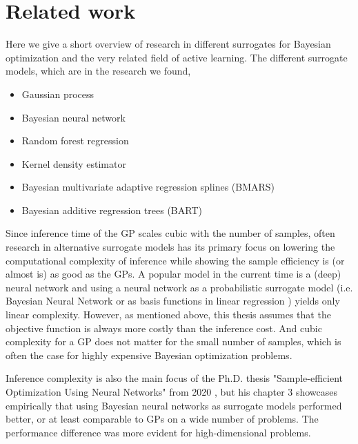     

\section{Related work}
Here we give a short overview of research in different surrogates for Bayesian optimization
and the very related field of active learning. The different surrogate models, which are in the 
research we found, 
\begin{itemize}[noitemsep]
    \item Gaussian process
    \item Bayesian neural network
    \item Random forest regression
    \item Kernel density estimator
    \item Bayesian multivariate adaptive regression splines (BMARS)
    \item Bayesian additive regression trees (BART)
\end{itemize}

Since inference time of the GP scales cubic with the number of samples, often research in
alternative surrogate models has its primary focus on lowering the computational complexity of
inference while showing the sample efficiency is (or almost is) as good as the GPs. A popular model
in the current time is a (deep) neural network and using a neural network as a probabilistic
surrogate model (i.e. Bayesian Neural Network \cite{BOHAMIANN} or as basis functions in linear
regression \cite{DNGO}) yields only linear complexity. However, as mentioned above, this thesis
assumes that the objective function is always more costly than the inference cost. And cubic
complexity for a GP does not matter for the small number of samples, which is often the case for
highly expensive Bayesian optimization problems. 

Inference complexity is also the main focus of the Ph.D. thesis "Sample-efficient Optimization Using
Neural Networks" from 2020 \cite{PhDthesis}, but his chapter 3 showcases empirically that using Bayesian
neural networks as surrogate models performed better, or at least comparable to GPs on a wide number
of problems. The performance difference was more evident for high-dimensional problems.

